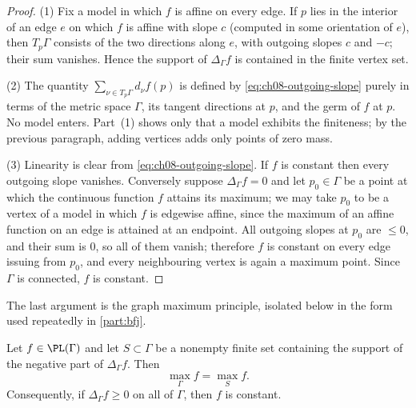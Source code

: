 \begin{proof}
(1)  Fix a model in which $f$ is affine on every edge.  If $p$ lies in the
interior of an edge $e$ on which $f$ is affine with slope $c$ (computed in
some orientation of $e$), then $T_p\Gamma$ consists of the two directions
along $e$, with outgoing slopes $c$ and $-c$; their sum vanishes.  Hence the
support of $\Delta_\Gamma f$ is contained in the finite vertex set.

(2)  The quantity $\sum_{\nu\in T_p\Gamma}d_\nu f(p)$ is defined by
\eqref{eq:ch08-outgoing-slope} purely in terms of the metric space
$\Gamma$, its tangent directions at $p$, and the germ of $f$ at $p$.  No
model enters.  Part~(1) shows only that a model exhibits the finiteness; by
the previous paragraph, adding vertices adds only points of zero mass.

(3)  Linearity is clear from \eqref{eq:ch08-outgoing-slope}.  If $f$ is
constant then every outgoing slope vanishes.  Conversely suppose
$\Delta_\Gamma f=0$ and let $p_0\in\Gamma$ be a point at which the continuous
function $f$ attains its maximum; we may take $p_0$ to be a vertex of a model
in which $f$ is edgewise affine, since the maximum of an affine function on an
edge is attained at an endpoint.  All outgoing slopes at $p_0$ are
$\leq0$, and their sum is $0$, so all of them vanish; therefore $f$ is
constant on every edge issuing from $p_0$, and every neighbouring vertex is
again a maximum point.  Since $\Gamma$ is connected, $f$ is constant.
\end{proof}

The last argument is the graph maximum principle, isolated below in the form
used repeatedly in \cref{part:bfj}.

\begin{proposition}
\label{prop:ch08-graph-maximum}
Let $f\in\PL(\Gamma)$ and let $S\subset\Gamma$ be a nonempty finite set
containing the support of the negative part of $\Delta_\Gamma f$.  Then
\[
                 \max_\Gamma f=\max_{S}f .
\]
Consequently, if $\Delta_\Gamma f\geq0$ on all of $\Gamma$, then $f$ is
constant.
\end{proposition}

